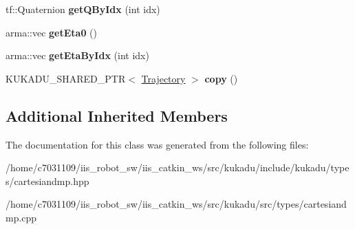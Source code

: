 \begin{DoxyCompactItemize}
\item 
\hypertarget{classkukadu_1_1CartesianDMP_ace0ee0c745d7d3dd6f5d2a04715fc173}{tf\-::\-Quaternion {\bfseries get\-Q\-By\-Idx} (int idx)}\label{classkukadu_1_1CartesianDMP_ace0ee0c745d7d3dd6f5d2a04715fc173}

\item 
\hypertarget{classkukadu_1_1CartesianDMP_a1a973cebbac6ef7039ab1d5a22d56d94}{arma\-::vec {\bfseries get\-Eta0} ()}\label{classkukadu_1_1CartesianDMP_a1a973cebbac6ef7039ab1d5a22d56d94}

\item 
\hypertarget{classkukadu_1_1CartesianDMP_a7d296abeb41ad68cd9b2dd6ca41efd27}{arma\-::vec {\bfseries get\-Eta\-By\-Idx} (int idx)}\label{classkukadu_1_1CartesianDMP_a7d296abeb41ad68cd9b2dd6ca41efd27}

\item 
\hypertarget{classkukadu_1_1CartesianDMP_a9e4074fd82f6256d3b534015c03c3912}{K\-U\-K\-A\-D\-U\-\_\-\-S\-H\-A\-R\-E\-D\-\_\-\-P\-T\-R$<$ \hyperlink{classkukadu_1_1Trajectory}{Trajectory} $>$ {\bfseries copy} ()}\label{classkukadu_1_1CartesianDMP_a9e4074fd82f6256d3b534015c03c3912}

\end{DoxyCompactItemize}
\subsection*{Additional Inherited Members}


The documentation for this class was generated from the following files\-:\begin{DoxyCompactItemize}
\item 
/home/c7031109/iis\-\_\-robot\-\_\-sw/iis\-\_\-catkin\-\_\-ws/src/kukadu/include/kukadu/types/cartesiandmp.\-hpp\item 
/home/c7031109/iis\-\_\-robot\-\_\-sw/iis\-\_\-catkin\-\_\-ws/src/kukadu/src/types/cartesiandmp.\-cpp\end{DoxyCompactItemize}
